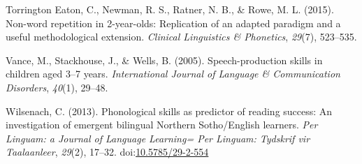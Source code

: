 \documentclass[english,,man,floatsintext]{apa6}
\begin{document}
\hypertarget{ref-torrington2015non}{}
Torrington Eaton, C., Newman, R. S., Ratner, N. B., \& Rowe, M. L.
(2015). Non-word repetition in 2-year-olds: Replication of an adapted
paradigm and a useful methodological extension. \emph{Clinical
Linguistics \& Phonetics}, \emph{29}(7), 523--535.

\hypertarget{ref-vance2005speech}{}
Vance, M., Stackhouse, J., \& Wells, B. (2005). Speech-production skills
in children aged 3--7 years. \emph{International Journal of Language \&
Communication Disorders}, \emph{40}(1), 29--48.

\hypertarget{ref-wilsenach2013phonological}{}
Wilsenach, C. (2013). Phonological skills as predictor of reading
success: An investigation of emergent bilingual Northern Sotho/English
learners. \emph{Per Linguam: a Journal of Language Learning= Per
Linguam: Tydskrif vir Taalaanleer}, \emph{29}(2), 17--32.
doi:\href{https://doi.org/10.5785/29-2-554}{10.5785/29-2-554}
\end{document}
